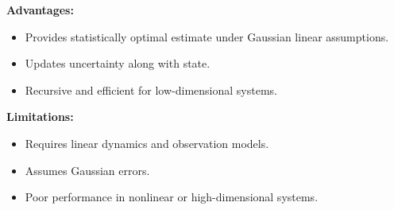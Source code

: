 \documentclass[a4paper]{article}
\begin{document}
\textbf{Advantages:}\\

\begin{itemize}
  \item Provides statistically optimal estimate under Gaussian linear assumptions.
  \item Updates uncertainty along with state.
  \item Recursive and efficient for low-dimensional systems.
\end{itemize}

\textbf{Limitations:}\\

\begin{itemize}
  \item Requires linear dynamics and observation models.
  \item Assumes Gaussian errors.
  \item Poor performance in nonlinear or high-dimensional systems.
\end{itemize}

\end{document}
